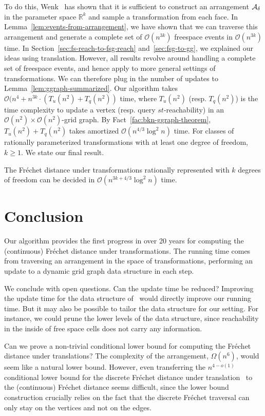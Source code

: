 \documentclass[thm-restate]{lipics-v2021}
\theoremstyle{remark}
\newcommand{\Oh}{\mathcal{O}}
\newcommand{\reals}[0]{\mathbb{R}}
\begin{document}
To do this, Wenk~\cite{wenkShapeMatchingHigher2003} has shown that it is sufficient to construct an arrangement $\mathcal{A_\delta}$ in the parameter space $\reals^k$ and sample a transformation from each face. In Lemma~\ref{lem:events-from-arrangement}, we have shown that we can traverse this arrangement and generate a complete set of $\Oh(n^{3k})$ freespace events in $\Oh(n^{3k})$ time. In Section~\ref{sec:fs-reach-to-fsg-reach} and~\ref{sec:fsg-to-gg}, we explained our ideas using translation. However, all results revolve around handling a complete set of freespace events, and hence apply to more general settings of transformations. We can therefore plug in the number of updates to Lemma~\ref{lem:ggraph-summarized}. Our algorithm takes $\Oh(n^4 + n^{3k} \cdot (T_u(n^2) + T_q(n^2))$ time, where $T_u(n^2)$ (resp. $T_q(n^2)$) is the time complexity to update a vertex (resp. query $st$-reachability) in an $\Oh(n^2) \times \Oh(n^2)$-grid graph. By Fact~\ref{fac:bkn-ggraph-theorem}, $T_u(n^2) + T_q(n^2)$ takes amortized $\Oh(n^{4/3} \log^2 n)$ time. For classes of rationally parameterized transformations with at least one degree of freedom, $k \geq 1$. 
We state our final result.
\begin{theorem}
    The Fréchet distance under transformations rationally represented with $k$ degrees of freedom can be decided in $\Oh(n^{3k + 4/3} \log^2 n)$ time. 
\end{theorem}

\section{Conclusion}

Our algorithm provides the first progress in over 20 years for computing the (continuous) Fr\'echet distance under transformations. The running time comes from traversing an arrangement in the space of transformations, performing an update to a dynamic grid graph data structure in each step. 

We conclude with open questions. Can the update time be reduced? Improving the update time for the data structure of~\cite{bringmannFrechetDistanceTranslation2021} would directly improve our running time. But it may also be possible to tailor the data structure for our setting. For instance, we could prune the lower levels of the data structure, since reachability in the inside of free space cells does not carry any information.

Can we prove a non-trivial conditional lower bound for computing the Fr\'echet distance under translations? The complexity of the arrangement, $\Omega(n^6)$, would seem like a natural lower bound. However, even transferring the $n^{4-o(1)}$ conditional lower bound for the discrete Fr\'echet distance under translation~\cite{bringmannFrechetDistanceTranslation2021} to the (continuous) Fr\'echet distance seems difficult, since the lower bound construction crucially relies on the fact that the discrete Fréchet traversal can only stay on the vertices and not on the edges.


 
\end{document}
